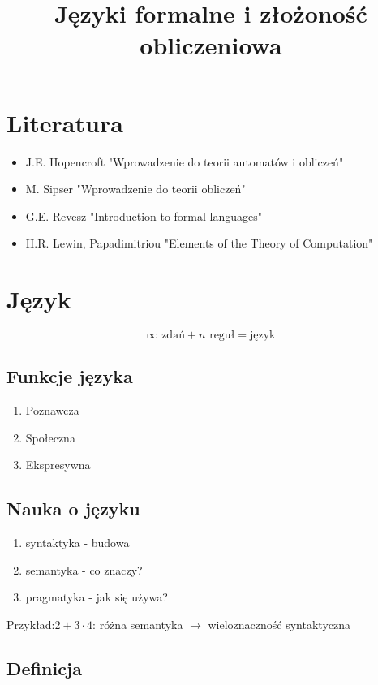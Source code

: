 \documentclass{../notatki}
\title{Języki formalne i złożoność obliczeniowa}
\begin{document}
\tableofcontents

\newpage

\section{Literatura}

\begin{itemize}
  \item J.E. Hopencroft "Wprowadzenie do teorii automatów i obliczeń"
  \item M. Sipser "Wprowadzenie do teorii obliczeń"
  \item G.E. Revesz "Introduction to formal languages"
  \item H.R. Lewin, Papadimitriou "Elements of the Theory of Computation"
\end{itemize}

\section{Język}

$$
\infty \text{ zdań} + n \text{ reguł} = \text{język}
$$

\subsection{Funkcje języka}

\begin{enumerate}
  \item Poznawcza
  \item Społeczna
  \item Ekspresywna
\end{enumerate}

\subsection{Nauka o języku}

\begin{enumerate}
  \item syntaktyka - budowa
  \item semantyka - co znaczy?
  \item pragmatyka - jak się używa?
\end{enumerate}
Przykład:$2 + 3 \cdot 4$: różna semantyka $\rightarrow$
wieloznaczność syntaktyczna

\subsection{Definicja}
\end{document}
